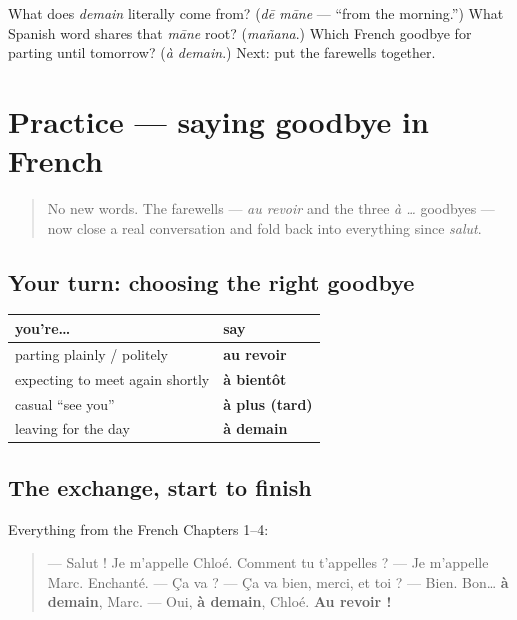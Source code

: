 \begin{tcolorbox}[breakable,colback=teal!4,colframe=teal!35!black,title={Before you move on}]
What does \emph{demain} literally come from? (\emph{dē māne} — \textquotedblleft{}from the morning.\textquotedblright{}) What Spanish word shares that \emph{māne} root? (\emph{mañana}.) Which French goodbye for parting until tomorrow? (\emph{à demain}.) Next: put the farewells together.
\end{tcolorbox}
\section[Practice]{Practice — saying goodbye in French}

\label{lesson:FR-C04-practice}



\begin{quote}
No new words. The farewells — \emph{au revoir} and the three \emph{à …} goodbyes — now close a real conversation and fold back into everything since \emph{salut}.
\end{quote}

\subsection*{Your turn: choosing the right goodbye}
\noindent
\begin{tabularx}{\linewidth}{@{}>{\raggedright\arraybackslash}X>{\raggedright\arraybackslash}X@{}}
\toprule
\textbf{you're…} & \textbf{say} \\
\midrule
parting plainly / politely & \textbf{au revoir} \\
expecting to meet again shortly & \textbf{à bientôt} \\
casual \textquotedblleft{}see you\textquotedblright{} & \textbf{à plus (tard)} \\
leaving for the day & \textbf{à demain} \\
\bottomrule
\end{tabularx}

\subsection*{The exchange, start to finish}
Everything from the French Chapters 1–4:

\begin{quote}
— Salut ! Je m'appelle Chloé. Comment tu t'appelles ? — Je m'appelle Marc. Enchanté. — Ça va ? — Ça va bien, merci, et toi ? — Bien. Bon… \textbf{à demain}, Marc. — Oui, \textbf{à demain}, Chloé. \textbf{Au revoir !}
\end{quote}


